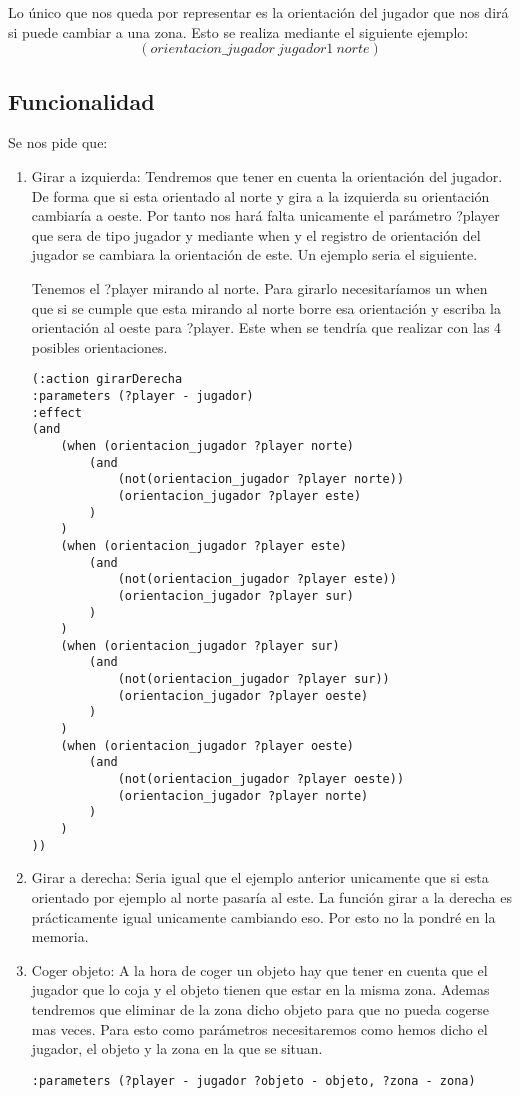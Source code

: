 \documentclass[]{article}
\begin{document}
Lo único que nos queda por representar es la orientación del jugador que nos dirá si puede cambiar a una zona. Esto se realiza mediante el siguiente ejemplo:
$$
(orientacion\_jugador\ jugador1\ norte)
$$

\subsection{Funcionalidad}
Se nos pide que: 
\begin{enumerate}
\item{Girar a izquierda:}
Tendremos que tener en cuenta la orientación del jugador. De forma que si esta orientado al norte y gira a la izquierda su orientación cambiaría a oeste. Por tanto nos hará falta unicamente el parámetro ?player que sera de tipo jugador y mediante when y el registro de orientación del jugador se cambiara la orientación de este. Un ejemplo seria el siguiente.
\newline

Tenemos el ?player mirando al norte. Para girarlo necesitaríamos un when que si se cumple que esta mirando al norte borre esa orientación y escriba la orientación al oeste para ?player. Este when se tendría que realizar con las 4 posibles orientaciones.

\begin{lstlisting}
(:action girarDerecha
:parameters (?player - jugador)
:effect
(and
	(when (orientacion_jugador ?player norte) 
		(and 
			(not(orientacion_jugador ?player norte)) 
			(orientacion_jugador ?player este)
		)
	)
	(when (orientacion_jugador ?player este) 
		(and 
			(not(orientacion_jugador ?player este)) 
			(orientacion_jugador ?player sur)
		)
	)
	(when (orientacion_jugador ?player sur) 
		(and 
			(not(orientacion_jugador ?player sur)) 
			(orientacion_jugador ?player oeste)
		)
	)
	(when (orientacion_jugador ?player oeste) 
		(and 
			(not(orientacion_jugador ?player oeste)) 
			(orientacion_jugador ?player norte)
		)
	)
))
\end{lstlisting}


\item{Girar a derecha:} Seria igual que el ejemplo anterior unicamente que si esta orientado por ejemplo al norte pasaría al este. La función girar a la derecha es prácticamente igual unicamente cambiando eso. Por esto no la pondré en la memoria.

\item{Coger objeto:} A la hora de coger un objeto hay que tener en cuenta que el jugador que lo coja y el objeto tienen que estar en la misma zona. Ademas tendremos que eliminar de la zona dicho objeto para que no pueda cogerse mas veces.
Para esto como parámetros necesitaremos como hemos dicho el jugador, el objeto y la zona en la que se situan. 
\begin{lstlisting}
:parameters	(?player - jugador ?objeto - objeto, ?zona - zona)
\end{lstlisting}


\end{enumerate}
\end{document}
